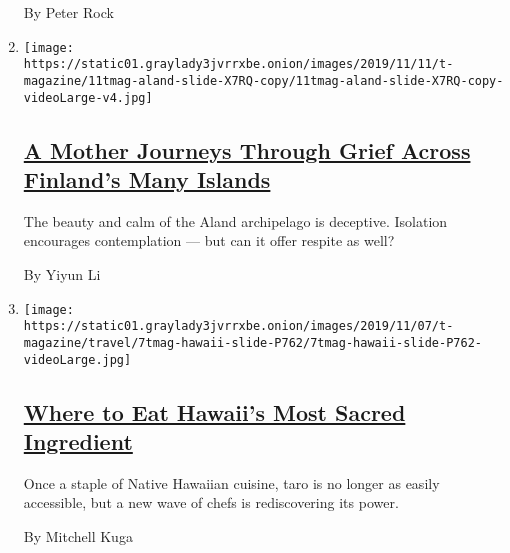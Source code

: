 \begin{enumerate}
  By Peter Rock
\item
  \texttt{[image: https://static01.graylady3jvrrxbe.onion/images/2019/11/11/t-magazine/11tmag-aland-slide-X7RQ-copy/11tmag-aland-slide-X7RQ-copy-videoLarge-v4.jpg]}

  \hypertarget{a-mother-journeys-through-grief-across-finlands-many-islands}{%
  \subsection{\texorpdfstring{\href{/2019/11/12/t-magazine/mother-loses-son-travel-coping.html}{A
  Mother Journeys Through Grief Across Finland's Many
  Islands}}{A Mother Journeys Through Grief Across Finland's Many Islands}}\label{a-mother-journeys-through-grief-across-finlands-many-islands}}

  The beauty and calm of the Aland archipelago is deceptive. Isolation
  encourages contemplation --- but can it offer respite as well?

  By Yiyun Li
\item
  \texttt{[image: https://static01.graylady3jvrrxbe.onion/images/2019/11/07/t-magazine/travel/7tmag-hawaii-slide-P762/7tmag-hawaii-slide-P762-videoLarge.jpg]}

  \hypertarget{where-to-eat-hawaiis-most-sacred-ingredient}{%
  \subsection{\texorpdfstring{\href{/2019/11/08/t-magazine/hawaii-restaurants.html}{Where
  to Eat Hawaii's Most Sacred
  Ingredient}}{Where to Eat Hawaii's Most Sacred Ingredient}}\label{where-to-eat-hawaiis-most-sacred-ingredient}}

  Once a staple of Native Hawaiian cuisine, taro is no longer as easily
  accessible, but a new wave of chefs is rediscovering its power.

  By Mitchell Kuga
\end{enumerate}

